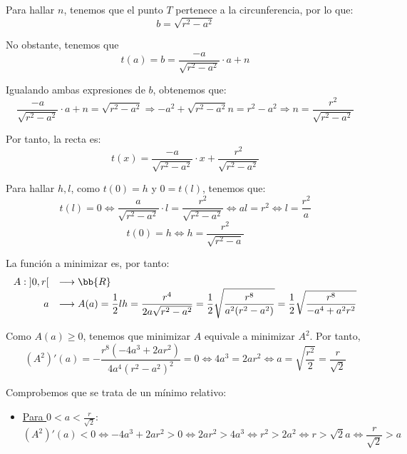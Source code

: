 \documentclass[12pt]{article}
\begin{document}
\begin{ejercicio}
Para hallar $n$, tenemos que el punto $T$ pertenece a la circunferencia, por lo que:
$$b=\sqrt{r^2-a^2}$$

No obstante, tenemos que
\begin{equation*}
    t(a)=b = \frac{-a}{\sqrt{r^2-a^2}}\cdot a +n
\end{equation*}

Igualando ambas expresiones de $b$, obtenemos que:
\begin{equation*}
    \frac{-a}{\sqrt{r^2-a^2}}\cdot a +n = \sqrt{r^2-a^2} \Longrightarrow -a^2+ \sqrt{r^2-a^2}n = r^2-a^2 \Longrightarrow
    n = \frac{r^2}{\sqrt{r^2-a^2}}
\end{equation*}

Por tanto, la recta es:
\begin{equation*}
    t(x)=\frac{-a}{\sqrt{r^2-a^2}}\cdot x + \frac{r^2}{\sqrt{r^2-a^2}}
\end{equation*}

Para hallar $h,l$, como $t(0)=h$ y $0=t(l)$, tenemos que:
\begin{equation*}
    t(l)=0 \Longleftrightarrow \frac{a}{\sqrt{r^2-a^2}}\cdot l = \frac{r^2}{\sqrt{r^2-a^2}} \Longleftrightarrow al=r^2 \Longleftrightarrow l=\frac{r^2}{a} 
\end{equation*}
\begin{equation*}
    t(0)=h \Longleftrightarrow h = \frac{r^2}{\sqrt{r^2-a}}
\end{equation*}

La función a minimizar es, por tanto:
\begin{equation*}
    \begin{array}{rl}
        A:\left]0, r\right[ & \longrightarrow \bb{R}\\
                a & \longrightarrow A(a) = \displaystyle \frac{1}{2}lh = \frac{r^4}{2a\sqrt{r^2-a^2}} = \frac{1}{2}\sqrt{\frac{r^8}{a^2(r^2-a^2)}}
                = \frac{1}{2}\sqrt{\frac{r^8}{-a^4 +a^2r^2}}
    \end{array}
\end{equation*}

Como $A(a)\geq 0$, tenemos que minimizar $A$ equivale a minimizar $A^2$. Por tanto,
\begin{equation*}
    (A^2)'(a)=-\frac{r^8(-4a^3+2ar^2)}{4a^4(r^2-a^2)^2} = 0 \Longleftrightarrow 4a^3=2ar^2 \Longleftrightarrow a=\sqrt{\frac{r^2}{2}} = \frac{r}{\sqrt{2}}
\end{equation*}

Comprobemos que se trata de un mínimo relativo:
\begin{itemize}
    \item \underline{Para $0<a<\frac{r}{\sqrt{2}}$}:
    \begin{equation*}
        (A^2)'(a)<0 \Longleftrightarrow -4a^3+2ar^2>0 \Longleftrightarrow 2ar^2>4a^3
        \Longleftrightarrow r^2>2a^2
        \Longleftrightarrow r>\sqrt{2}a 
        \Longleftrightarrow \frac{r}{\sqrt{2}}>a 
    \end{equation*}


\end{itemize}
\end{ejercicio}
\end{document}
